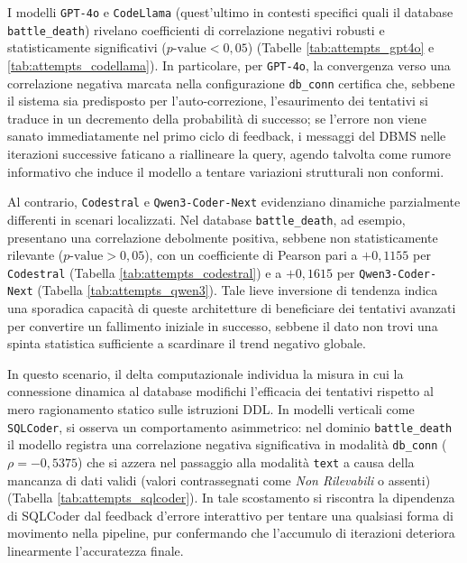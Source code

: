 I modelli \texttt{GPT-4o} e \texttt{CodeLlama} (quest'ultimo in contesti
specifici quali il database \texttt{battle\_death}) rivelano
coefficienti di correlazione negativi robusti e statisticamente
significativi (\(p\text{-value} < 0,05\)) (Tabelle \ref{tab:attempts_gpt4o} e \ref{tab:attempts_codellama}). In
particolare, per \texttt{GPT-4o}, la convergenza verso una correlazione
negativa marcata nella configurazione \texttt{db\_conn} certifica che,
sebbene il sistema sia predisposto per l'auto-correzione, l'esaurimento
dei tentativi si traduce in un decremento della probabilità di successo;
se l'errore non viene sanato immediatamente nel primo ciclo di feedback,
i messaggi del DBMS nelle iterazioni successive faticano a riallineare
la query, agendo talvolta come rumore informativo che induce il modello
a tentare variazioni strutturali non conformi.

Al contrario, \texttt{Codestral} e \texttt{Qwen3-Coder-Next} evidenziano
dinamiche parzialmente differenti in scenari localizzati. Nel database
\texttt{battle\_death}, ad esempio, presentano una correlazione
debolmente positiva, sebbene non statisticamente rilevante
(\(p\text{-value} > 0,05\)), con un coefficiente di Pearson pari a
\(+0,1155\) per \texttt{Codestral} (Tabella \ref{tab:attempts_codestral}) e a \(+0,1615\) per
\texttt{Qwen3-Coder-Next} (Tabella \ref{tab:attempts_qwen3}). Tale lieve inversione di
tendenza indica una sporadica capacità di queste architetture di
beneficiare dei tentativi avanzati per convertire un fallimento iniziale
in successo, sebbene il dato non trovi una spinta statistica sufficiente
a scardinare il trend negativo globale.

In questo scenario, il delta computazionale individua la misura in cui
la connessione dinamica al database modifichi l'efficacia dei tentativi
rispetto al mero ragionamento statico sulle istruzioni DDL. In modelli
verticali come \texttt{SQLCoder}, si osserva un comportamento
asimmetrico: nel dominio \texttt{battle\_death} il modello registra una
correlazione negativa significativa in modalità \texttt{db\_conn}
(\(\rho = -0,5375\)) che si azzera nel passaggio alla modalità
\texttt{text} a causa della mancanza di dati validi (valori
contrassegnati come \emph{Non Rilevabili} o assenti) (Tabella \ref{tab:attempts_sqlcoder}).
In tale scostamento si riscontra la dipendenza di SQLCoder dal feedback d’errore interattivo
per tentare una qualsiasi forma di
movimento nella pipeline, pur confermando che l'accumulo di iterazioni
deteriora linearmente l'accuratezza finale.

